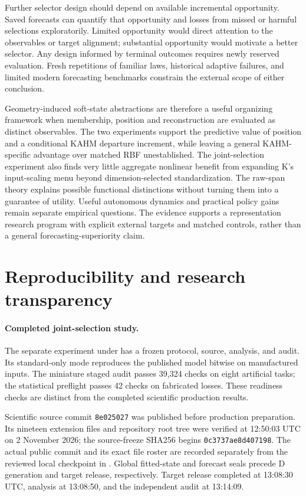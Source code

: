 Further selector design should depend on available incremental
opportunity. Saved forecasts can quantify that opportunity and losses
from missed or harmful selections exploratorily. Limited opportunity
would direct attention to the observables or target alignment;
substantial opportunity would motivate a better selector.
Any design informed by terminal outcomes requires newly reserved
evaluation. Fresh repetitions of familiar laws, historical adaptive
failures, and limited modern forecasting benchmarks constrain the
external scope of either conclusion.

Geometry-induced soft-state abstractions are therefore a useful
organizing framework when membership, position and reconstruction
are evaluated as distinct observables. The two experiments
support the predictive value of position and a conditional KAHM
departure increment, while leaving a general KAHM-specific advantage
over matched RBF unestablished. The joint-selection experiment
also finds very little aggregate nonlinear benefit from expanding
K's input-scaling menu beyond dimension-selected standardization.
The raw-span theory explains possible
functional distinctions without turning them into a guarantee of
utility. Useful autonomous dynamics and practical policy gains remain
separate empirical questions. The evidence supports a representation
research program with explicit external targets and matched controls,
rather than a general forecasting-superiority claim.

\section*{Reproducibility and research transparency}

\paragraph{Completed joint-selection study.}
The separate experiment under
 has a frozen
protocol, source, analysis, and audit. Its standard-only mode
reproduces the published model bitwise on manufactured inputs.
The miniature staged audit passes 39,324 checks on eight artificial
tasks; the statistical preflight passes 42 checks on fabricated
losses. These readiness checks are distinct from the completed
scientific production results.

Scientific source commit \texttt{8e025027} was published before
production preparation. Its nineteen extension files and repository
root tree were verified at
12:50:03 UTC on 2 November 2026; the source-freeze SHA256 begins
\texttt{0c3737ae8d407198}. The actual public commit and its exact
file roster are recorded separately from the reviewed local
checkpoint in . Global fitted-state and
forecast seals precede D generation and target release, respectively.
Target release completed at 13:08:30 UTC, analysis at 13:08:50,
and the independent audit at 13:14:09.

